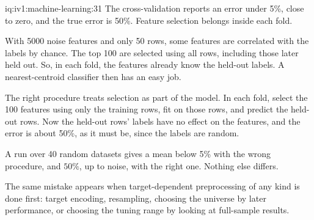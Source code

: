 \begin{solution}{iq:iv1:machine-learning:31}
The cross-validation reports an error under 5\%, close to zero, and the true error is 50\%. Feature selection belongs inside each fold.

With 5000 noise features and only 50 rows, some features are correlated with the labels by chance. The top 100 are selected using all rows, including those later held out. So, in each fold, the features already know the held-out labels. A nearest-centroid classifier then has an easy job.

The right procedure treats selection as part of the model. In each fold, select the 100 features using only the training rows, fit on those rows, and predict the held-out rows. Now the held-out rows' labels have no effect on the features, and the error is about 50\%, as it must be, since the labels are random.

A run over 40 random datasets gives a mean below 5\% with the wrong procedure, and $50\%$, up to noise, with the right one. Nothing else differs.

The same mistake appears when target-dependent preprocessing of any kind is done first: target encoding, resampling, choosing the universe by later performance, or choosing the tuning range by looking at full-sample results.



\end{solution}

